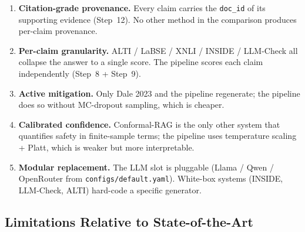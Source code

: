 \begin{enumerate}
    \item \textbf{Citation-grade provenance.} Every claim carries the
          \texttt{doc\_id} of its supporting evidence (Step~12). No other
          method in the comparison produces per-claim provenance.
    \item \textbf{Per-claim granularity.} ALTI / LaBSE / XNLI / INSIDE /
          LLM-Check all collapse the answer to a single score. The pipeline
          scores each claim independently (Step~8 + Step~9).
    \item \textbf{Active mitigation.} Only Dale 2023 and the pipeline
          regenerate; the pipeline does so without MC-dropout sampling,
          which is cheaper.
    \item \textbf{Calibrated confidence.} Conformal-RAG is the only other
          system that quantifies safety in finite-sample terms; the
          pipeline uses temperature scaling + Platt, which is weaker but
          more interpretable.
    \item \textbf{Modular replacement.} The LLM slot is pluggable (Llama /
          Qwen / OpenRouter from \texttt{configs/default.yaml}). White-box
          systems (INSIDE, LLM-Check, ALTI) hard-code a specific generator.
\end{enumerate}

\subsection{Limitations Relative to State-of-the-Art}
\label{sec:limitations}

